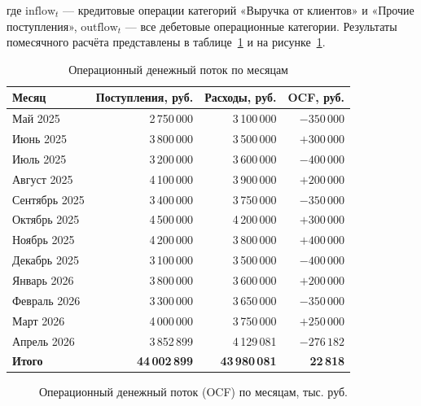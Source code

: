 где $\text{inflow}_t$ --- кредитовые операции категорий «Выручка от клиентов» и «Прочие поступления», $\text{outflow}_t$ --- все дебетовые операционные категории. Результаты помесячного расчёта представлены в таблице~\ref{tab:monthly_ocf} и на рисунке~\ref{fig:monthly_ocf_chart}.

\begin{table}[H]
\centering
\caption{Операционный денежный поток по месяцам}
\label{tab:monthly_ocf}
\begin{tabular}{lrrr}
\toprule
\textbf{Месяц} & \textbf{Поступления, руб.} & \textbf{Расходы, руб.} & \textbf{OCF, руб.} \\
\midrule
Май 2025 & 2\,750\,000 & 3\,100\,000 & $-350\,000$ \\
Июнь 2025 & 3\,800\,000 & 3\,500\,000 & $+300\,000$ \\
Июль 2025 & 3\,200\,000 & 3\,600\,000 & $-400\,000$ \\
Август 2025 & 4\,100\,000 & 3\,900\,000 & $+200\,000$ \\
Сентябрь 2025 & 3\,400\,000 & 3\,750\,000 & $-350\,000$ \\
Октябрь 2025 & 4\,500\,000 & 4\,200\,000 & $+300\,000$ \\
Ноябрь 2025 & 4\,200\,000 & 3\,800\,000 & $+400\,000$ \\
Декабрь 2025 & 3\,100\,000 & 3\,500\,000 & $-400\,000$ \\
Январь 2026 & 3\,800\,000 & 3\,600\,000 & $+200\,000$ \\
Февраль 2026 & 3\,300\,000 & 3\,650\,000 & $-350\,000$ \\
Март 2026 & 4\,000\,000 & 3\,750\,000 & $+250\,000$ \\
Апрель 2026 & 3\,852\,899 & 4\,129\,081 & $-276\,182$ \\
\midrule
\textbf{Итого} & \textbf{44\,002\,899} & \textbf{43\,980\,081} & \textbf{22\,818} \\
\bottomrule
\end{tabular}
\end{table}

\begin{figure}[H]
\centering
{}
\caption{Операционный денежный поток (OCF) по месяцам, тыс. руб.}
\label{fig:monthly_ocf_chart}
\end{figure}

